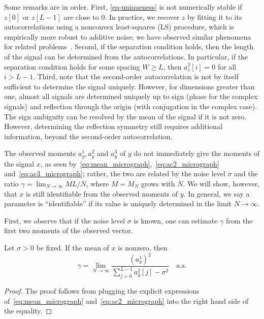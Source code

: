 \documentclass[9pt,twocolumn,twoside,lineno]{pnas-new}
\begin{document}
Some remarks are in order. First, \eqref{eq-uniqueness} is not numerically stable if $z[0]$ or $z[L-1]$ are close to 0. In practice, we recover $z$ by fitting it to its autocorrelations using a nonconvex least-squares (LS) procedure, which is empirically more robust to additive noise; we have observed similar phenomena for related problems~\cite{bendory2017bispectrum,boumal2017heterogeneous,abbe2017multireference}.
Second, if the separation condition holds, then the length of the signal can be determined from the autocorrelations.
In particular, if the separation condition holds for some spacing $W\geq L$, then $a_z^2[i]=0$ for all $i>L-1$.
Third, note that the second-order autocorrelation is not by itself sufficient to determine the signal uniquely. %
However, for dimensions greater than one, almost all signals are determined uniquely up to sign (phase for the complex signals) and reflection through the origin (with conjugation in the complex case). %
The sign ambiguity can be resolved by the mean of the signal if it is not zero. However, determining the reflection symmetry still requires additional information, beyond the second-order autocorrelation.

The observed moments $a_y^1,a_y^2$ and $a_y^3$ of $y$ do not immediately give the moments of the signal $x$, as seen by~\eqref{eq:mean_micrograph},~\eqref{eq:ac2_micrograph} and~\eqref{eq:ac3_micrograph}; rather, the two are related by the noise level $\sigma$ and the ratio $\gamma = \lim_{N\to\infty}ML/N$,  where $M=M_N$ grows with $N$. We will show, however, that $x$ is still identifiable from the observed moments of $y$. In general, we say a parameter is ``identifiable'' if its value is uniquely determined in the limit $N \to \infty$.

First, we observe that if the noise level $\sigma$ is known, one can estimate $\gamma$ from the first two moments of the observed vector.
%
\begin{proposition} \label{prop:gamma}
	Let $\sigma > 0$ be fixed. If the mean of $x$ is nonzero, then 
	\begin{equation*}
	\gamma = \lim_{N \to \infty}\frac{(a^1_y)^2}{\sum_{j=0}^{L-1}a_y^2[j]-\sigma^2} \quad \text{a.s.}
	\end{equation*}
\end{proposition}
\begin{proof}
	The proof follows from plugging the explicit expressions of~\eqref{eq:mean_micrograph} and~\eqref{eq:ac2_micrograph} into the right hand side of the equality.
\end{proof}
\end{document}
